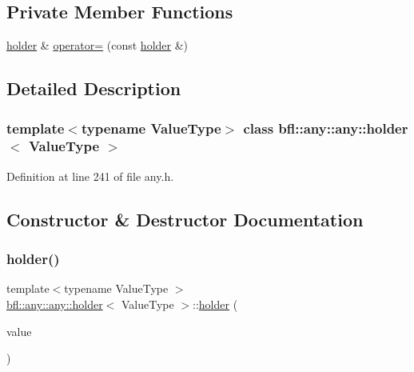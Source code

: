 \subsection*{Private Member Functions}
\begin{DoxyCompactItemize}
\item 
\mbox{\hyperlink{classbfl_1_1any_1_1any_1_1holder}{holder}} \& \mbox{\hyperlink{classbfl_1_1any_1_1any_1_1holder_abf9b67dde9f72c79d391e2fe886084dd}{operator=}} (const \mbox{\hyperlink{classbfl_1_1any_1_1any_1_1holder}{holder}} \&)
\end{DoxyCompactItemize}


\subsection{Detailed Description}
\subsubsection*{template$<$typename Value\+Type$>$\newline
class bfl\+::any\+::any\+::holder$<$ Value\+Type $>$}



Definition at line 241 of file any.\+h.



\subsection{Constructor \& Destructor Documentation}
\mbox{\label{classbfl_1_1any_1_1any_1_1holder_a8dd0bda2fdff0140ea5b255b63863d9c}} 
\subsubsection{\texorpdfstring{holder()}{holder()}\hspace{0.1cm}{\footnotesize\ttfamily [1/2]}}
{\footnotesize\ttfamily template$<$typename Value\+Type $>$ \\
\mbox{\hyperlink{classbfl_1_1any_1_1any_1_1holder}{bfl\+::any\+::any\+::holder}}$<$ Value\+Type $>$\+::\mbox{\hyperlink{classbfl_1_1any_1_1any_1_1holder}{holder}} (\begin{DoxyParamCaption}\item[{const Value\+Type \&}]{value }\end{DoxyParamCaption})\hspace{0.3cm}{\ttfamily [inline]}}




